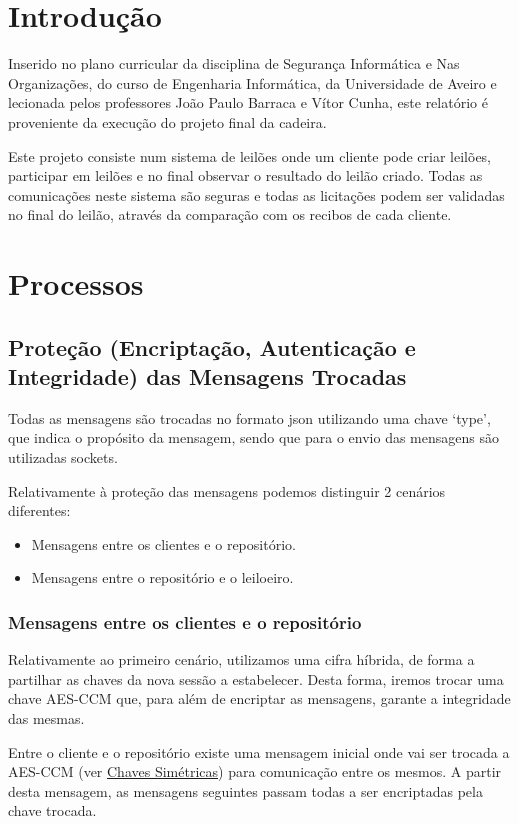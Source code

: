 \documentclass[12pt]{article}
\begin{document}
\section{Introdução}
Inserido no plano curricular da disciplina de Segurança Informática e Nas Organizações, do curso de Engenharia Informática, da Universidade de Aveiro e lecionada pelos professores João Paulo Barraca e Vítor Cunha, este relatório é proveniente da execução do projeto final da cadeira.
\par Este projeto consiste num sistema de leilões onde um cliente pode criar leilões, participar em leilões e no final observar o resultado do leilão criado. Todas as comunicações neste sistema são seguras e todas as licitações podem ser validadas no final do leilão, através da comparação com os recibos de cada cliente.
\clearpage


\section{Processos}
\subsection{Proteção (Encriptação, Autenticação e Integridade) das Mensagens Trocadas}

\par Todas as mensagens são trocadas no formato json utilizando uma chave ‘type’, que indica o propósito da mensagem, sendo que para o  envio das mensagens são utilizadas sockets. 


\noindent Relativamente à proteção das mensagens podemos distinguir 2 cenários diferentes:
\begin{itemize}
  \item Mensagens entre os clientes e o repositório.
  \item Mensagens entre o repositório e o leiloeiro.
\end{itemize}

\subsubsection{Mensagens entre os clientes e o repositório}

\par Relativamente ao primeiro cenário, utilizamos uma cifra híbrida, de forma a partilhar as chaves da nova sessão a estabelecer. Desta forma, iremos trocar uma chave AES-CCM que, para além de encriptar as mensagens, garante a integridade das mesmas.
\par Entre o cliente e o repositório existe uma mensagem inicial onde vai ser trocada a AES-CCM (ver \href{https://cryptography.io/en/latest/hazmat/primitives/symmetric-encryption/}{Chaves Simétricas}) para comunicação entre os mesmos. 
\newline
A partir desta mensagem, as mensagens seguintes passam todas a ser encriptadas pela chave trocada. 
\end{document}
